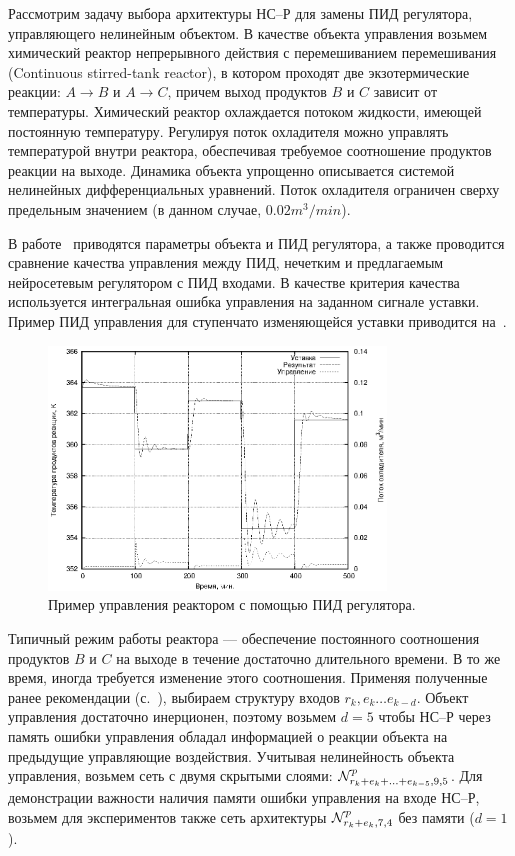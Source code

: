 Рассмотрим задачу выбора архитектуры НС--Р для замены ПИД регулятора,
управляющего нелинейным объектом.  В качестве объекта управления
возьмем химический реактор непрерывного действия с перемешиванием
перемешивания ~\cite{wiki-cstr} (Continuous stirred-tank reactor), в
котором проходят две экзотермические реакции: $A\rightarrow B$ и
$A\rightarrow C$, причем выход продуктов $B$ и $C$ зависит от
температуры.  Химический реактор охлаждается потоком жидкости, имеющей
постоянную температуру.  Регулируя поток охладителя можно управлять
температурой внутри реактора, обеспечивая требуемое соотношение
продуктов реакции на выходе.  Динамика объекта упрощенно описывается
системой нелинейных дифференциальных уравнений.  Поток охладителя
ограничен сверху предельным значением (в данном случае, $0.02
m^3/min$).

В работе~\cite{vas-bak2009} приводятся параметры объекта и ПИД
регулятора, а также проводится сравнение качества управления между
ПИД, нечетким и предлагаемым нейросетевым регулятором с ПИД входами.
В качестве критерия качества используется интегральная ошибка
управления на заданном сигнале уставки.  Пример ПИД управления для
ступенчато изменяющейся уставки приводится
на~.

\begin{figure}
\centering
\includegraphics[width=0.8\textwidth,%
  totalheight=0.35\textheight]{cstr_pid_ru}
\caption{Пример управления реактором с помощью ПИД регулятора.}%
\label{fig:cstr_pid_ru}
\end{figure}

Типичный режим работы реактора --- обеспечение постоянного соотношения
продуктов $B$ и $C$ на выходе в течение достаточно длительного
времени.  В то же время, иногда требуется изменение этого соотношения.
Применяя полученные ранее рекомендации
(с.~\pageref{nnc-inputs-rules}), выбираем структуру входов
$r_k,e_k\ldots e_{k-d}$.  Объект управления достаточно инерционен,
поэтому возьмем $d=5$ чтобы НС--Р через память ошибки управления
обладал информацией о реакции объекта на предыдущие управляющие
воздействия.  Учитывая нелинейность объекта управления, возьмем сеть с
двумя скрытыми слоями: $\mathcal{N}^p_{r_k+e_k+\ldots+e_{k-5},9,5}$.  Для
демонстрации важности наличия памяти ошибки управления на входе НС--Р,
возьмем для экспериментов также сеть архитектуры $\mathcal{N}^p_{r_k+e_k,7,4}$
без памяти ($d=1$).

